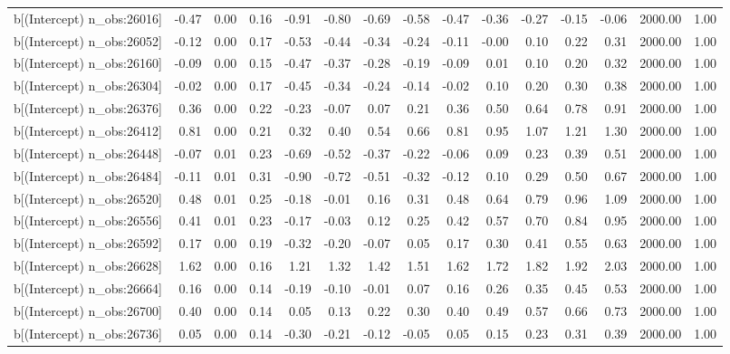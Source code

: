 \begin{table}[ht]
\begin{tabular}{rrrrrrrrrrrrrrr}
  b[(Intercept) n\_obs:26016] & -0.47 & 0.00 & 0.16 & -0.91 & -0.80 & -0.69 & -0.58 & -0.47 & -0.36 & -0.27 & -0.15 & -0.06 & 2000.00 & 1.00 \\ 
  b[(Intercept) n\_obs:26052] & -0.12 & 0.00 & 0.17 & -0.53 & -0.44 & -0.34 & -0.24 & -0.11 & -0.00 & 0.10 & 0.22 & 0.31 & 2000.00 & 1.00 \\ 
  b[(Intercept) n\_obs:26160] & -0.09 & 0.00 & 0.15 & -0.47 & -0.37 & -0.28 & -0.19 & -0.09 & 0.01 & 0.10 & 0.20 & 0.32 & 2000.00 & 1.00 \\ 
  b[(Intercept) n\_obs:26304] & -0.02 & 0.00 & 0.17 & -0.45 & -0.34 & -0.24 & -0.14 & -0.02 & 0.10 & 0.20 & 0.30 & 0.38 & 2000.00 & 1.00 \\ 
  b[(Intercept) n\_obs:26376] & 0.36 & 0.00 & 0.22 & -0.23 & -0.07 & 0.07 & 0.21 & 0.36 & 0.50 & 0.64 & 0.78 & 0.91 & 2000.00 & 1.00 \\ 
  b[(Intercept) n\_obs:26412] & 0.81 & 0.00 & 0.21 & 0.32 & 0.40 & 0.54 & 0.66 & 0.81 & 0.95 & 1.07 & 1.21 & 1.30 & 2000.00 & 1.00 \\ 
  b[(Intercept) n\_obs:26448] & -0.07 & 0.01 & 0.23 & -0.69 & -0.52 & -0.37 & -0.22 & -0.06 & 0.09 & 0.23 & 0.39 & 0.51 & 2000.00 & 1.00 \\ 
  b[(Intercept) n\_obs:26484] & -0.11 & 0.01 & 0.31 & -0.90 & -0.72 & -0.51 & -0.32 & -0.12 & 0.10 & 0.29 & 0.50 & 0.67 & 2000.00 & 1.00 \\ 
  b[(Intercept) n\_obs:26520] & 0.48 & 0.01 & 0.25 & -0.18 & -0.01 & 0.16 & 0.31 & 0.48 & 0.64 & 0.79 & 0.96 & 1.09 & 2000.00 & 1.00 \\ 
  b[(Intercept) n\_obs:26556] & 0.41 & 0.01 & 0.23 & -0.17 & -0.03 & 0.12 & 0.25 & 0.42 & 0.57 & 0.70 & 0.84 & 0.95 & 2000.00 & 1.00 \\ 
  b[(Intercept) n\_obs:26592] & 0.17 & 0.00 & 0.19 & -0.32 & -0.20 & -0.07 & 0.05 & 0.17 & 0.30 & 0.41 & 0.55 & 0.63 & 2000.00 & 1.00 \\ 
  b[(Intercept) n\_obs:26628] & 1.62 & 0.00 & 0.16 & 1.21 & 1.32 & 1.42 & 1.51 & 1.62 & 1.72 & 1.82 & 1.92 & 2.03 & 2000.00 & 1.00 \\ 
  b[(Intercept) n\_obs:26664] & 0.16 & 0.00 & 0.14 & -0.19 & -0.10 & -0.01 & 0.07 & 0.16 & 0.26 & 0.35 & 0.45 & 0.53 & 2000.00 & 1.00 \\ 
  b[(Intercept) n\_obs:26700] & 0.40 & 0.00 & 0.14 & 0.05 & 0.13 & 0.22 & 0.30 & 0.40 & 0.49 & 0.57 & 0.66 & 0.73 & 2000.00 & 1.00 \\ 
  b[(Intercept) n\_obs:26736] & 0.05 & 0.00 & 0.14 & -0.30 & -0.21 & -0.12 & -0.05 & 0.05 & 0.15 & 0.23 & 0.31 & 0.39 & 2000.00 & 1.00 \\ 

\end{tabular}
\end{table}
